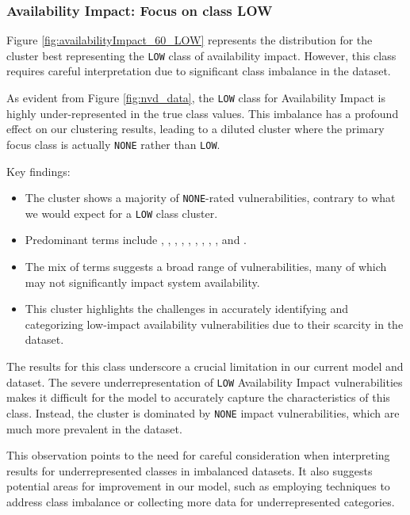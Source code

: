 \subsubsection{Availability Impact: Focus on class LOW}

Figure \ref{fig:availabilityImpact_60_LOW} represents the distribution for the cluster best representing the \texttt{LOW} class of availability impact. However, this class requires careful interpretation due to significant class imbalance in the dataset.

As evident from Figure \ref{fig:nvd_data}, the \texttt{LOW} class for Availability Impact is highly under-represented in the true class values. This imbalance has a profound effect on our clustering results, leading to a diluted cluster where the primary focus class is actually \texttt{NONE} rather than \texttt{LOW}.

Key findings:

\begin{itemize}
	\item The cluster shows a majority of \texttt{NONE}-rated vulnerabilities, contrary to what we would expect for a \texttt{LOW} class cluster.
	\item Predominant terms include , , , , , , , , , and .
	\item The mix of terms suggests a broad range of vulnerabilities, many of which may not significantly impact system availability.
	\item This cluster highlights the challenges in accurately identifying and categorizing low-impact availability vulnerabilities due to their scarcity in the dataset.
\end{itemize}

The results for this class underscore a crucial limitation in our current model and dataset. The severe underrepresentation of \texttt{LOW} Availability Impact vulnerabilities makes it difficult for the model to accurately capture the characteristics of this class. Instead, the cluster is dominated by \texttt{NONE} impact vulnerabilities, which are much more prevalent in the dataset.

This observation points to the need for careful consideration when interpreting results for underrepresented classes in imbalanced datasets. It also suggests potential areas for improvement in our model, such as employing techniques to address class imbalance or collecting more data for underrepresented categories.

